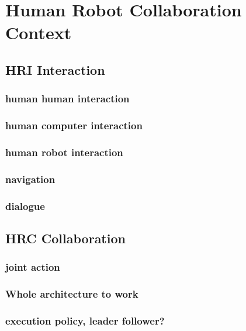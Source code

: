 \ifdefined{}
\else
\setcounter{chapter}{0}
\dominitoc
\faketableofcontents
\fi

\chapter{Human Robot Collaboration Context}
\label{chap:1}
\minitoc



\section{HRI Interaction}

\subsection{human human interaction}
\subsection{human computer interaction}
\subsection{human robot interaction}

\subsection{navigation}
\subsection{dialogue}


\section{HRC Collaboration}

\subsection{joint action}
\subsection{Whole architecture to work}
\subsection{execution policy, leader follower?}


